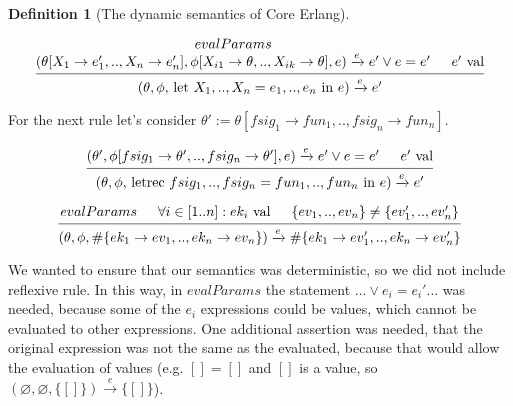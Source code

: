 \documentclass[12pt]{article}
\theoremstyle{definition}
\newtheorem{definition}{Definition}[section]
\newcommand{\ose}{\xrightarrow{e}}
\numberwithin{equation}{section}
\begin{document}
\begin{definition}[The dynamic semantics of Core Erlang]
\begin{center}
	\begin{equation}
		\begin{prooftree}
			\hypo{evalParams}
			\infer[no rule]1{(\theta[X_1 \rightarrow e_1', .., X_n \rightarrow e_n'], \phi[X_{i1} \rightarrow \theta, .., X_{ik} \rightarrow \theta], e) \ose e' \lor e = e'}
			\hypo{e'$ val$}
			\infer2{(\theta, \phi,$ let $X_1, .., X_n = e_1, .., e_n$ in $e) \ose e'}
		\end{prooftree}
		\label{OS:let}
	\end{equation}
	
	For the next rule let's consider $\theta' := \theta[fsig_1 \rightarrow fun_1, .., fsig_n \rightarrow fun_n]$.
	
	\begin{equation}
		\begin{prooftree}
			\hypo{(\theta', \phi[fsig_1 \rightarrow \theta', .., fsig_n \rightarrow \theta'], e) \ose e' \lor e = e'}
			\hypo{e'$ val$}
			\infer2{(\theta, \phi,$ letrec $fsig_1, .., fsig_n = fun_1, .., fun_n $ in $ e) \ose e'}
		\end{prooftree}
		\label{OS:letrec}
	\end{equation}
	
	\begin{equation}
		\begin{prooftree}
			\hypo{evalParams}
			\hypo{\forall i \in [1..n]: ek_i$ val$}
			\hypo{\{ev_1, .., ev_n\} \neq \{ev_1', .., ev_n'\} }
			\infer3{(\theta, \phi, \#\{ek_1 \rightarrow ev_1, .., ek_n \rightarrow ev_n\}) \ose \#\{ek_1 \rightarrow ev_1', .., ek_n \rightarrow ev_n'\}}
		\end{prooftree}
		\label{OS:map}
	\end{equation}
\end{center}
\end{definition}

We wanted to ensure that our semantics was deterministic, so we did not include reflexive rule. In this way, in $evalParams$ the statement $... \lor e_i = e_i' ...$ was needed, because some of the $e_i$ expressions could be values, which cannot be evaluated to other expressions. One additional assertion was needed, that the original expression was not the same as the evaluated, because that would allow the evaluation of values (e.g. $[] = []$ and $[]$ is a value, so $(\varnothing, \varnothing, \{[]\}) \ose \{[]\}$).
\end{document}
